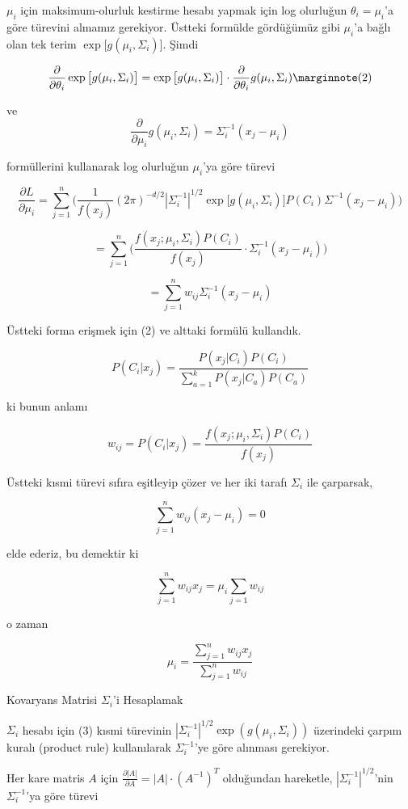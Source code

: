 \documentclass[12pt,fleqn]{article}\usepackage{../../common}
\begin{document}
$\mu_i$ için maksimum-olurluk kestirme hesabı yapmak için log olurluğun
$\theta_i=\mu_i$'a göre türevini almamız gerekiyor. Üstteki formülde
gördüğümüz gibi $\mu_i$'a bağlı olan tek terim $\exp\big[ g(\mu_i,\Sigma_i)
\big]$. Şimdi 

$$ 
\frac{\partial }{\partial \theta_i} \exp \big[ g(\mu_i,\Sigma_i) \big] =
\exp \big[ g(\mu_i,\Sigma_i) \big] \cdot 
\frac{\partial }{\partial \theta_i} g(\mu_i,\Sigma_i)
\mlabel{2}
$$

ve
$$ \frac{\partial }{\partial \mu_i}g(\mu_i,\Sigma_i) = 
\Sigma_i^{-1}(x_j-\mu_i)
$$

formüllerini kullanarak log olurluğun $\mu_i$'ya göre türevi

$$ \frac{\partial L}{\partial \mu_i} = 
\sum_{j=1}^{n} \bigg(
\frac{1}{f(x_j)} 
(2\pi)^{-d/2} |\Sigma_i^{-1}|^{1/2} \exp\big[ 
g(\mu_i,\Sigma_i) \big] P(C_i) \Sigma^{-1} 
(x_j-\mu_i)
\bigg)
$$

$$ 
= \sum_{j=1}^{n} \bigg(
\frac{f(x_j;\mu_i,\Sigma_i)P(C_i)}{f(x_j)} \cdot 
\Sigma_i^{-1} (x_j-\mu_i)
\bigg)
$$

$$ =
\sum_{j=1}^{n} w_{ij} \Sigma_i^{-1}(x_j-\mu_i)
$$

Üstteki forma erişmek için (2) ve alttaki formülü kullandık.

$$ P(C_i|x_j) = \frac{P(x_j|C_i)P(C_i)}{\sum_{a=1}^{k}P(x_j|C_a)P(C_a)}$$

ki bunun anlamı

$$ w_{ij} = P(C_i|x_j) = \frac{f(x_j;\mu_i,\Sigma_i)P(C_i)}{f(x_j)}$$

Üstteki kısmi türevi sıfıra eşitleyip çözer ve her iki tarafı $\Sigma_i$
ile çarparsak, 

$$ \sum_{j=1}^{n} w_{ij} (x_j-\mu_i) = 0 $$

elde ederiz, bu demektir ki 

$$ \sum_{j=1}^{n} w_{ij}x_j = \mu_i\sum_{j=1} w_{ij}  $$

o zaman 

$$ \mu_i = \frac{\sum_{j=1}^{n} w_{ij}x_j}{\sum_{j=1}^{n} w_{ij}}$$

Kovaryans Matrisi $\Sigma_i$'i Hesaplamak

$\Sigma_i$ hesabı için (3) kısmi türevinin $|\Sigma_i^{-1}|^{1/2}
\exp(g(\mu_i,\Sigma_i))$ üzerindeki çarpım 
kuralı (product rule) kullanılarak $\Sigma_i^{-1}$'ye göre alınması gerekiyor.

Her kare matris $A$ için $\frac{\partial |A|}{\partial A} = |A| \cdot
(A^{-1})^T$ olduğundan hareketle, $|\Sigma_i^{-1}|^{1/2}$'nin
$\Sigma_i^{-1}$'ya göre türevi  
\end{document}
